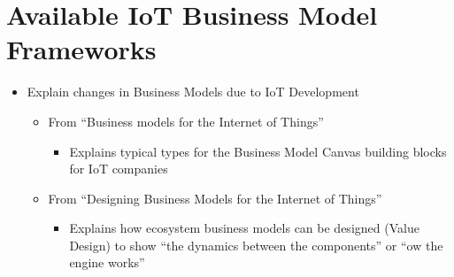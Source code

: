 \section{Available IoT Business Model Frameworks}
	\begin{itemize}
		\item Explain changes in Business Models due to IoT Development
			\begin{itemize}
				\item From ``Business models for the Internet of Things'' \cite{dijkman}
				\begin{itemize}
					\item Explains typical types for the Business Model Canvas building blocks for IoT companies
				\end{itemize}
				\item From ``Designing Business Models for the Internet of Things'' \cite{westerlund}
				\begin{itemize}
					\item Explains how ecosystem business models can be designed (Value Design) to show ``the dynamics between the components'' or ``ow the engine works''


\end{itemize}
\end{itemize}
\end{itemize}
